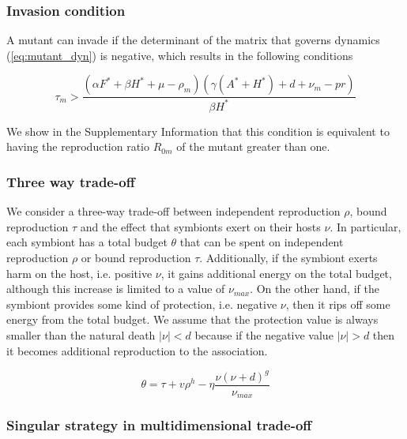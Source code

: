 \documentclass[11pt]{article}
\begin{document}
\subsubsection*{Invasion condition}
A mutant can invade if the determinant of the matrix that governs dynamics (\ref{eq:mutant_dyn}) is negative, which results in the following conditions

\begin{equation}
	\tau_m > \frac{(\alpha  F^* + \beta  H^* + \mu  - \rho_m) (\gamma  (A^* + H^*) + d + \nu_m - p r)}{\beta  H^*}
	\label{eq:invasion}
\end{equation}

We show in the Supplementary Information that this condition is equivalent to having the reproduction ratio $R_{0m}$ of the mutant greater than one.

\subsubsection*{Three way trade-off}
We consider a three-way trade-off between independent reproduction $\rho$, bound reproduction $\tau$ and the effect that symbionts exert on their hosts $\nu$. 
In particular, each symbiont has a total budget $\theta$ that can be spent on independent reproduction $\rho$ or bound reproduction $\tau$. 
Additionally, if the symbiont exerts harm on the host, i.e. positive $\nu$, it gains additional energy on the total budget, although this increase is limited to a value of $\nu_{max}$. 
On the other hand, if the symbiont provides some kind of protection, i.e. negative $\nu$, then it rips off some energy from the total budget. We assume that the protection value is always smaller than the natural death $\mid \nu \mid < d$ because if the negative value $\mid \nu \mid > d$ then it becomes additional reproduction to the association. 

\begin{equation}
	\theta = \tau + v \rho^h -  \eta \frac{\nu (\nu + d)^g}{\nu_{max}}
	\label{eq:tradeoff}
\end{equation}

\subsubsection*{Singular strategy in multidimensional trade-off}
\end{document}
